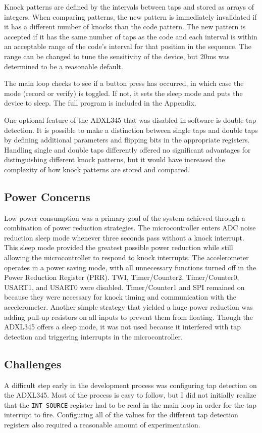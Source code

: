 \documentclass[conference]{./IEEEtran}
\begin{document}
Knock patterns are defined by the intervals between taps and stored as arrays of integers. When comparing patterns, the new pattern is immediately invalidated if it has a different number of knocks than the code pattern. The new pattern is accepted if it has the same number of taps as the code and each interval is within an acceptable range of the code's interval for that position in the sequence. The range can be changed to tune the sensitivity of the device, but 20ms was determined to be a reasonable default.

The main loop checks to see if a button press has occurred, in which case the mode (record or verify) is toggled. If not, it sets the sleep mode and puts the device to sleep. The full program is included in the Appendix.

One optional feature of the ADXL345 that was disabled in software is double tap detection. It is possible to make a distinction between single taps and double taps by defining additional parameters and flipping bits in the appropriate registers. Handling single and double taps differently offered no significant advantages for distinguishing different knock patterns, but it would have increased the complexity of how knock patterns are stored and compared. 


\subsection{Power Concerns}
Low power consumption was a primary goal of the system achieved through a combination of power reduction strategies. The microcontroller enters ADC noise reduction sleep mode whenever three seconds pass without a knock interrupt. This sleep mode provided the greatest possible power reduction while still allowing the microcontroller to respond to knock interrupts. The accelerometer operates in a power saving mode, with all unnecessary functions turned off in the Power Reduction Register (PRR). TWI, Timer/Counter2, Timer/Counter0, USART1, and USART0 were disabled. Timer/Counter1 and SPI remained on because they were necessary for knock timing and communication with the accelerometer. Another simple strategy that yielded a huge power reduction was adding pull-up resistors on all inputs to prevent them from floating. Though the ADXL345 offers a sleep mode, it was not used because it interfered with tap detection and triggering interrupts in the microcontroller. 

\subsection{Challenges}
A difficult step early in the development process was configuring tap detection on the ADXL345. Most of the process is easy to follow, but I did not initially realize that the \texttt{INT\_SOURCE} register had to be read in the main loop in order for the tap interrupt to fire. Configuring all of the values for the different tap detection registers also required a reasonable amount of experimentation. 
\end{document}
